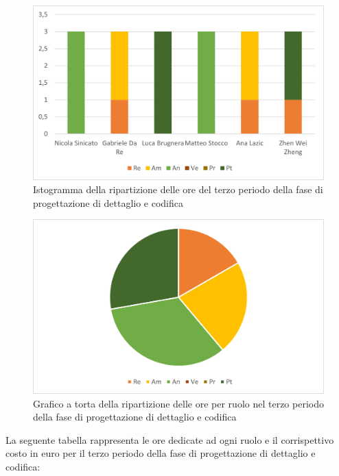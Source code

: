 \begin{figure}[H]
    \centering
    \includegraphics[scale=0.6]{img/grafi preventivo/istogrammi/codifica/periodo3.png}
    \caption{Istogramma della ripartizione delle ore del terzo periodo della fase di progettazione di dettaglio e codifica}
\end{figure}
\begin{figure}[H]
    \centering
    \includegraphics[scale=0.6]{img/grafi preventivo/torta/codifica/periodo3.png}
    \caption{Grafico a torta della ripartizione delle ore per ruolo nel terzo periodo della fase di progettazione di dettaglio e codifica}
\end{figure}
La seguente tabella rappresenta le ore dedicate ad ogni ruolo e il corrispettivo costo in euro per il terzo periodo della fase di progettazione di dettaglio e codifica:

